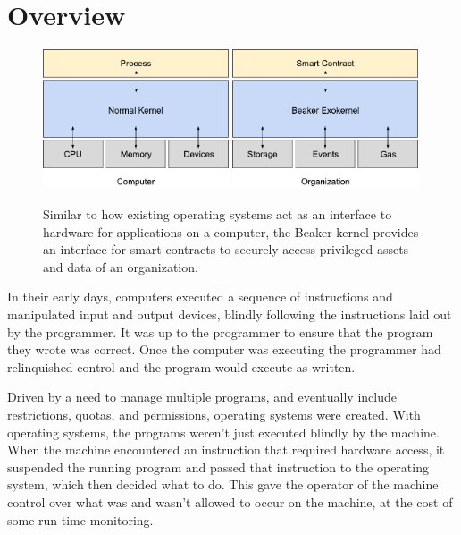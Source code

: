 \documentclass[english,a4paper]{article}
\begin{document}
\section{Overview}\label{overview}
\begin{figure}[H]
    \includegraphics[width=0.49\textwidth]{media/NormalKernelOverview.pdf}
    \includegraphics[width=0.49\textwidth]{media/BeakerKernelOverview.pdf}

    \caption{Similar to how existing operating systems act as an
    interface to hardware for applications on a computer, the Beaker kernel
    provides an interface for smart contracts to securely access privileged
    assets and data of an organization.\label{fig:kernels}}
\end{figure}

In their early days, computers executed a sequence of instructions and
manipulated input and output devices, blindly following the instructions
laid out by the programmer. It was up to the programmer to ensure that
the program they wrote was correct. Once the computer was executing the
programmer had relinquished control and the program would execute as
written.

Driven by a need to manage multiple programs, and eventually include
restrictions, quotas, and permissions, operating systems were created.
With operating systems, the programs weren't just executed blindly by
the machine. When the machine encountered an instruction that required
hardware access, it suspended the running program and passed that
instruction to the operating system, which then decided what to do. This
gave the operator of the machine control over what was and wasn't
allowed to occur on the machine, at the cost of some run-time
monitoring.
\end{document}
